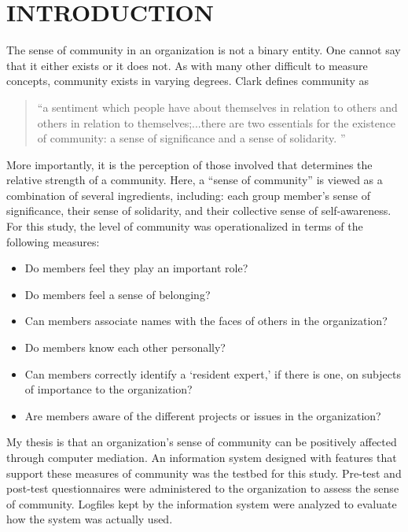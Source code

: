 \section{INTRODUCTION}
The sense of community in an organization is not a binary entity.  One cannot
say that it either exists or it does not.  As with many other difficult to
measure concepts, community exists in varying degrees.  Clark \cite{Clark73}
defines community as

\begin{quote}
  ``a sentiment which people have about themselves in relation to others and
  others in relation to themselves;...there are two essentials for the
  existence of community: a sense of significance and a sense of solidarity.
  ''
\end{quote}

More importantly, it is the perception of those involved that determines the
relative strength of a community.  Here, a ``sense of community'' is viewed as
a combination of several ingredients, including: each group member's sense of
significance, their sense of solidarity, and their collective sense of
self-awareness.  For this study, the level of community was operationalized in
terms of the following measures:

\begin{itemize}
\item{Do members feel they play an important role?}\\
\item{Do members feel a sense of belonging?}\\
\item{Can members associate names with the faces of others in the organization?}\\
\item{Do members know each other personally?}\\
\item{Can members correctly identify a `resident expert,' if there is one, on
  subjects of importance to the organization?}\\
\item{Are members aware of the different projects or issues in the
  organization?}
\end{itemize}

My thesis is that an organization's sense of community can be positively
affected through computer mediation.  An information system designed with
features that support these measures of community was the testbed for this
study.  Pre-test and post-test questionnaires were administered to the
organization to assess the sense of community.  Logfiles kept by the
information system were analyzed to evaluate how the system was actually used.

